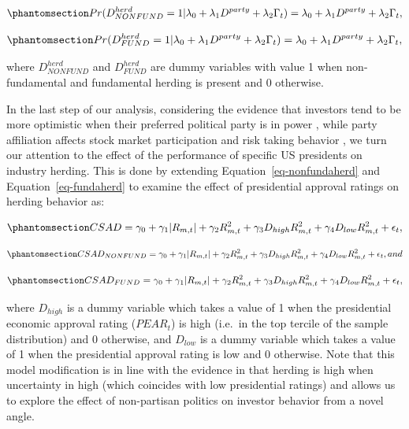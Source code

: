 \documentclass[
  letterpaper,
  DIV=11,
  numbers=noendperiod]{scrartcl}
\begin{document}
\begin{equation}\phantomsection\label{eq-politicalnonfund}{
Pr(D^{herd}_{NONFUND} = 1 |\lambda_0 +  \lambda_1D^{party}  + \lambda_2\Gamma_t) = \lambda_0 +  \lambda_1D^{party}  + \lambda_2\Gamma_t,
}\end{equation}

\begin{equation}\phantomsection\label{eq-politicalfund}{
Pr(D^{herd}_{FUND}= 1 |\lambda_0 +  \lambda_1D^{party}  + \lambda_2\Gamma_t) = \lambda_0 +  \lambda_1D^{party}  + \lambda_2\Gamma_t,
}\end{equation}

where \(D^{herd}_{NONFUND}\) and \(D^{herd}_{FUND}\) are dummy variables
with value 1 when non-fundamental and fundamental herding is present and
0 otherwise.

In the last step of our analysis, considering the evidence that
investors tend to be more optimistic when their preferred political
party is in power \citep{montone2022does}, while party affiliation
affects stock market participation \citep{kaustia2011stock} and risk
taking behavior \citep{bonaparte2017political}, we turn our attention to
the effect of the performance of specific US presidents on industry
herding. This is done by extending Equation~\ref{eq-nonfundaherd} and
Equation~\ref{eq-fundaherd} to examine the effect of presidential
approval ratings on herding behavior as:

\begin{equation}\phantomsection\label{eq-approval_overall}{
CSAD = \gamma_0 + \gamma_1|R_{m,t}| + \gamma_2R_{m, t}^2 + \gamma_3D_{high}R_{m,t}^2 + \gamma_4D_{low}R_{m,t}^2 + \epsilon_{t}, 
}\end{equation}

\begin{equation}\phantomsection\label{eq-approval}{
CSAD_{NONFUND} = \gamma_0 + \gamma_1|R_{m,t}| + \gamma_2R_{m, t}^2 + \gamma_3D_{high}R_{m,t}^2 + \gamma_4D_{low}R_{m,t}^2 + \epsilon_{t}, and
}\end{equation}

\begin{equation}\phantomsection\label{eq-approval_econ}{
CSAD_{FUND} = \gamma_0 + \gamma_1|R_{m,t}| + \gamma_2R_{m, t}^2 + \gamma_3D_{high}R_{m,t}^2 + \gamma_4D_{low}R_{m,t}^2 + \epsilon_{t}, 
}\end{equation}

where \(D_{high}\) is a dummy variable which takes a value of 1 when the
presidential economic approval rating (\(PEAR_t\)) is high (i.e.~in the
top tercile of the sample distribution) and 0 otherwise, and \(D_{low}\)
is a dummy variable which takes a value of 1 when the presidential
approval rating is low and 0 otherwise. Note that this model
modification is in line with the evidence in \citet{pastor2020political}
that herding is high when uncertainty in high (which coincides with low
presidential ratings) and allows us to explore the effect of
non-partisan politics on investor behavior from a novel angle.
\end{document}
